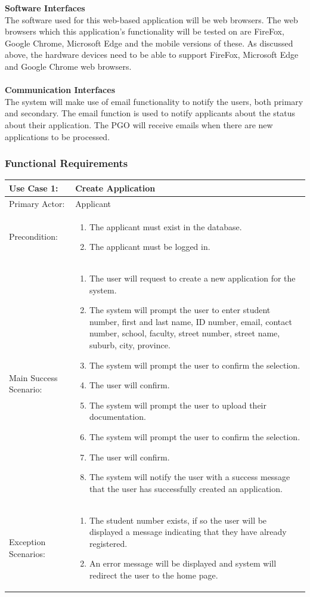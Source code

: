 \documentclass{article}
\begin{document}
\textbf{Software Interfaces} \\
The software used for this web-based application will be web browsers. The web browsers which this application’s functionality will be tested on are FireFox, Google Chrome, Microsoft Edge and the mobile versions of these. As discussed above, the hardware devices need to be able to support FireFox, Microsoft Edge and Google Chrome web browsers.\\  \\
\textbf{Communication Interfaces} \\
The system will make use of email functionality to notify the users, both primary and secondary. The email function is used to notify applicants about the status about their application. The PGO will receive emails when there are new applications to be processed. 
\subsubsection{Functional Requirements}
\begin{tabular} {| m{5cm} | m{10cm} |}
\hline
Use Case 1: & Create Application \\
\hline
Primary Actor: & Applicant \\
\hline
Precondition: & \begin{enumerate} \itemsep0em \item The applicant must exist in the database.
\item The applicant must be logged in. 
\end{enumerate} \\
\hline
Main Success Scenario: & \begin{enumerate} \itemsep0em \item The user will request to create a new application for the system. 
\item The system will prompt the user to enter student number, first and last name, ID number, email, contact number, school, faculty, street number, street name, suburb, city, province.
\item The system will prompt the user to confirm the selection.
\item The user will confirm.
\item The system will prompt the user to upload their  documentation.
\item The system will prompt the user to confirm the selection.
\item The user will confirm.
\item The system will notify the user with a success message that the user has successfully created an application.
\end{enumerate}\\
\hline
Exception Scenarios: & \begin{enumerate}
\itemsep0em \item The student number exists, if so the user will be displayed a message indicating that they have already registered.
\item An error message will be displayed and system will redirect the user to the home page.
\end{enumerate} \\
\hline
\end{tabular}
\end{document}
